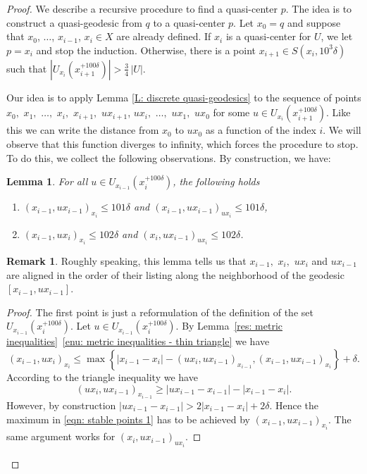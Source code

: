 \documentclass[11pt]{article}
\newcommand{\skpt}{\smallskip}
\theoremstyle{plain}
\newtheorem{lem}[thm]{Lemma}
\theoremstyle{definition}
\newtheorem{rem}[thm]{Remark}
\begin{document}
\begin{proof}
We describe a recursive procedure to find a quasi-center $p$.
The idea is to construct a quasi-geodesic from $q$ to a quasi-center $p$.
Let $x_0=q$ and suppose that $x_0$, $\ldots$, $x_{i-1}$, $x_i\in X$ are already defined.
If $x_i$ is a quasi-center for $U$, we let $p=x_i$ and stop the induction.
Otherwise, there is a point $x_{i+1} \in S(x_i,10^3\delta)$ such that $|U_{x_i}(x_{i+1}^{+ 100 \delta})| > \frac{3}{4}\, |U|$.

Our idea is to apply Lemma \ref{L: discrete quasi-geodesics} to the sequence of points $x_0,$ $x_1,$ $\dots,$ $x_i,$ $x_{i+1},$ $ux_{i+1}$, $ ux_i,$ $\dots,$ $ux_1,$ $ux_0$ for some $u \in U_{x_i}(x_{i+1}^{+ 100 \delta})$. Like this we can write the distance from $x_0$ to $ux_0$ as a function of the index $i$.
We will observe that this function diverges to infinity, which forces the procedure to stop.
To do this, we collect the following observations. By construction, we have:

\begin{lem}\label{L: stable points 1}
For all $u \in U_{x_{i-1}}(x_{i}^{+100\delta})$, the following holds
\begin{enumerate}
\item $(x_{i-1},ux_{i-1})_{x_i}\leqslant 101\delta$ and $(x_{i-1},u{x_{i-1}})_{ux_i}\leqslant 101\delta$,
\item $(x_{i-1},ux_i)_{x_i} \leq 102\delta$ and $(x_i, ux_{i-1})_{ux_i} \leq 102\delta$.
\end{enumerate}
\end{lem}

\begin{rem}
Roughly speaking, this lemma tells us that $x_{i-1},$ $x_i,$ $ux_i$ and $ux_{i-1}$ are aligned in the order of their listing along the neighborhood of the geodesic $[x_{i-1},ux_{i-1}]$.
\end{rem}

\skpt
\begin{proof}
The first point is just a reformulation of the definition of the set~$U_{x_{i-1}}(x_{i}^{+100\delta})$.
Let $u \in U_{x_{i-1}}(x_{i}^{+100\delta})$.
By Lemma~\ref{res: metric inequalities}~\eqref{enu: metric inequalities - thin triangle} we have
\begin{equation}
\label{eqn: stable points 1}
(x_{i-1},ux_i)_{x_i}\leq \max \left\{|x_{i-1}- x_i| - (ux_i, ux_{i-1})_{x_{i-1}}, (x_{i-1},ux_{i-1})_{x_i}\right\} + \delta.
\end{equation}
According to the triangle inequality we have
\begin{equation*}
(ux_i, ux_{i-1})_{x_{i-1}} \geq |ux_{i-1} - x_{i-1}| - |x_{i-1} - x_i|.
\end{equation*}
However, by construction $|ux_{i-1} - x_{i-1}| > 2|x_{i-1} - x_i| + 2\delta$.
Hence the maximum in \eqref{eqn: stable points 1} has to be achieved by $(x_{i-1},ux_{i-1})_{x_i}$.
The same argument works for $(x_i, ux_{i-1})_{ux_i}$.
\end{proof}


\end{proof}
\end{document}
